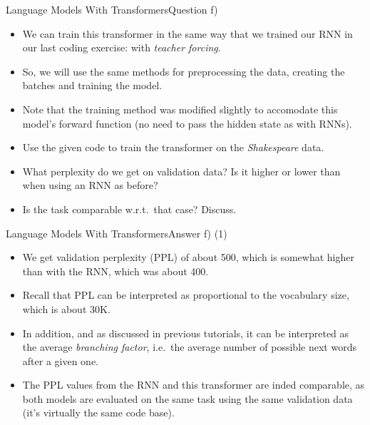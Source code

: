 \documentclass[t]{beamer}
\begin{document}
\begin{frame}{Language Models With Transformers}{Question f)}
    \begin{itemize}
        \item We can train this transformer in the same way that we trained our
              RNN in our last coding exercise: with \emph{teacher forcing}.
        \item So, we will use the same methods for preprocessing the data,
              creating the batches and training the model.
        \item Note that the training method was modified slightly to accomodate
              this model's forward function (no need to pass the hidden state as
              with RNNs).
        \item Use the given code to train the transformer on the
              \emph{Shakespeare} data.
        \item What perplexity do we get on validation data?
              Is it higher or lower than when using an RNN as before?
        \item Is the task comparable w.r.t.\ that case? Discuss.
    \end{itemize}
\end{frame}

\begin{frame}{Language Models With Transformers}{Answer f) (1)}
    \begin{itemize}
        \item We get validation perplexity (PPL) of about 500, which is somewhat
              higher than with the RNN, which was about 400.
        \item Recall that PPL can be interpreted as proportional to the
              vocabulary size, which is about 30K.
        \item In addition, and as discussed in previous tutorials, it can be
              interpreted as the average \emph{branching factor}, i.e.\ the
              average number of possible next words after a given one.
        \item The PPL values from the RNN and this transformer are inded
              comparable,
              as both models are evaluated on the same task using the same
              validation data (it's virtually the same code base).
    \end{itemize}
\end{frame}
\end{document}
